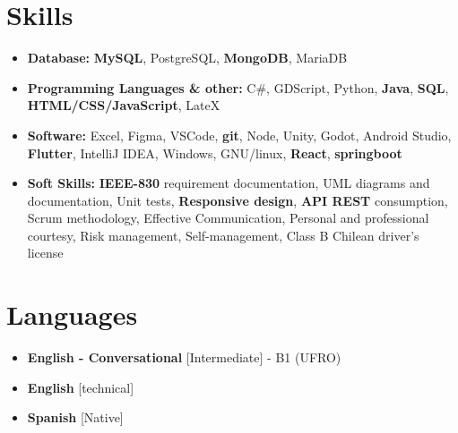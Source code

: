 \documentclass[11pt,a4paper,sans]{moderncv}
\newcommand{\sectionMargin}{-3mm}
\begin{document}
\section{Skills}{
\begin{itemize}[label=\textbullet]
    \item {\textbf{Database:} 
        \textbf{MySQL}, 
        PostgreSQL, 
        \textbf{MongoDB}, 
        MariaDB
    }
    \item {\textbf{Programming Languages \& other:} 
        C\#, 
        GDScript, 
        Python, 
        \textbf{Java},
        \textbf{SQL},
        \textbf{HTML/CSS/JavaScript},
        LateX
    }
    \item {\textbf{Software:} 
        Excel,
        Figma,
        VSCode,
        \textbf{git},
        Node,
        Unity,
        Godot,
        Android Studio,
        \textbf{Flutter},
        IntelliJ IDEA,
        Windows,
        GNU/linux,
        \textbf{React},
        \textbf{springboot}
    }
    \item {\textbf{Soft Skills:}
        \textbf{IEEE-830} requirement documentation,
        UML diagrams and documentation,
        Unit tests,
        \textbf{Responsive design},
        \textbf{API REST} consumption,
        Scrum methodology,
        Effective Communication, 
        Personal and professional courtesy, 
        Risk management, 
        Self-management, 
        Class B Chilean driver's license
    }
\end{itemize}}

\vspace*{\sectionMargin}

\section{Languages}
\begin{multicols}{2}
    \begin{itemize}[label=\textbullet]
        \item \textbf{English - Conversational} [Intermediate] - B1 (UFRO)
        \item \textbf{English} [technical]
        \item \textbf{Spanish} [Native]
    \end{itemize}
\end{multicols}
\end{document}
